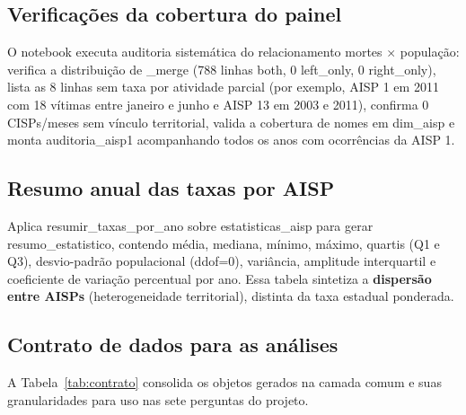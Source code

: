 \documentclass[11pt,a4paper]{article}
\newcommand{\code}[1]{{\ttfamily\footnotesize\allowbreak #1}}
\begin{document}
\subsection{Verificações da cobertura do painel}
O notebook executa auditoria sistemática do relacionamento mortes $\times$ população: verifica a distribuição de \code{\_merge} (788 linhas \code{both}, 0 \code{left\_only}, 0 \code{right\_only}), lista as 8 linhas sem taxa por atividade parcial (por exemplo, AISP 1 em 2011 com 18 vítimas entre janeiro e junho e AISP 13 em 2003 e 2011), confirma 0 CISPs/meses sem vínculo territorial, valida a cobertura de nomes em \code{dim\_aisp} e monta \code{auditoria\_aisp1} acompanhando todos os anos com ocorrências da AISP 1.

\subsection{Resumo anual das taxas por AISP}
Aplica \code{resumir\_taxas\_por\_ano} sobre \code{estatisticas\_aisp} para gerar \code{resumo\_estatistico}, contendo média, mediana, mínimo, máximo, quartis (Q1 e Q3), desvio-padrão populacional (\code{ddof=0}), variância, amplitude interquartil e coeficiente de variação percentual por ano. Essa tabela sintetiza a \textbf{dispersão entre AISPs} (heterogeneidade territorial), distinta da taxa estadual ponderada.

\subsection{Contrato de dados para as análises}
A Tabela~\ref{tab:contrato} consolida os objetos gerados na camada comum e suas granularidades para uso nas sete perguntas do projeto.
\end{document}
